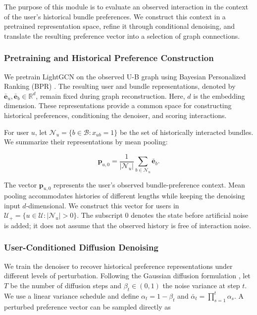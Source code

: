 \documentclass[letterpaper]{article}
\begin{document}
The purpose of this module is to evaluate an observed interaction in the context of the user's historical bundle preferences. We construct this context in a pretrained representation space, refine it through conditional denoising, and translate the resulting preference vector into a selection of graph connections.

\subsubsection{Pretraining and Historical Preference Construction}

We pretrain LightGCN \cite{he2020lightgcn} on the observed U-B graph using Bayesian Personalized Ranking (BPR) \cite{rendle2009bpr}. The resulting user and bundle representations, denoted by $\bar{\mathbf e}_u,\bar{\mathbf e}_b\in\mathbb R^d$, remain fixed during graph reconstruction. Here, $d$ is the embedding dimension. These representations provide a common space for constructing historical preferences, conditioning the denoiser, and scoring interactions.

For user $u$, let $\mathcal N_u=\{b\in\mathcal B:x_{ub}=1\}$ be the set of historically interacted bundles. We summarize their representations by mean pooling:

\begin{equation}
\mathbf p_{u,0}
=\frac{1}{|\mathcal N_u|}
\sum_{b\in\mathcal N_u}\bar{\mathbf e}_b.
\tag{1}
\end{equation}

The vector $\mathbf p_{u,0}$ represents the user's observed bundle-preference context. Mean pooling accommodates histories of different lengths while keeping the denoising input $d$-dimensional. We construct this vector for users in $\mathcal U_+=\{u\in\mathcal U:|\mathcal N_u|>0\}$. The subscript $0$ denotes the state before artificial noise is added; it does not assume that the observed history is free of interaction noise.

\subsubsection{User-Conditioned Diffusion Denoising}

We train the denoiser to recover historical preference representations under different levels of perturbation. Following the Gaussian diffusion formulation \cite{ho2020ddpm,wang2023diffrec}, let $T$ be the number of diffusion steps and $\beta_t\in(0,1)$ the noise variance at step $t$. We use a linear variance schedule and define $\alpha_t=1-\beta_t$ and $\bar\alpha_t=\prod_{s=1}^{t}\alpha_s$. A perturbed preference vector can be sampled directly as
\end{document}
